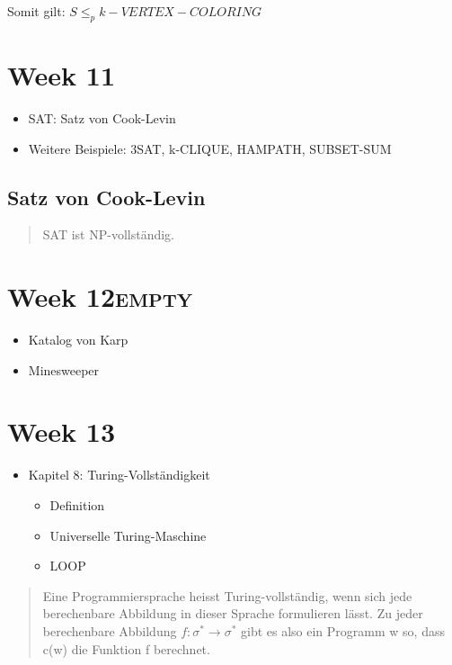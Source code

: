 \documentclass[11pt,twoside,landscape]{article}
\begin{document}
\begin{multicols}{3}
Somit gilt: \(S \leq_p k-VERTEX-COLORING\)

\section{Week 11}
\label{sec:orgb4c33bb}
\begin{itemize}
\item SAT: Satz von Cook-Levin
\item Weitere Beispiele: 3SAT, k-CLIQUE, HAMPATH, SUBSET-SUM
\end{itemize}


\subsection{Satz von Cook-Levin}
\label{sec:orgdbf63c9}
\begin{quote}
SAT ist NP-vollständig.
\end{quote}

\section{Week 12\hfill{}\textsc{empty}}
\label{sec:org352c46c}
\begin{itemize}
\item Katalog von Karp
\item Minesweeper
\end{itemize}

\section{Week 13}
\label{sec:org89c38ef}
\begin{itemize}
\item Kapitel 8: Turing-Vollständigkeit
\begin{itemize}
\item Definition
\item Universelle Turing-Maschine
\item LOOP
\end{itemize}
\end{itemize}

\begin{quote}
Eine Programmiersprache heisst Turing-vollständig, wenn sich jede berechenbare Abbildung in dieser Sprache formulieren lässt. Zu jeder berechenbare Abbildung \(f: \sigma^*  \rightarrow \sigma^*\) gibt es also ein Programm w so, dass c(w) die Funktion f berechnet.
\end{quote}


\end{multicols}
\end{document}

